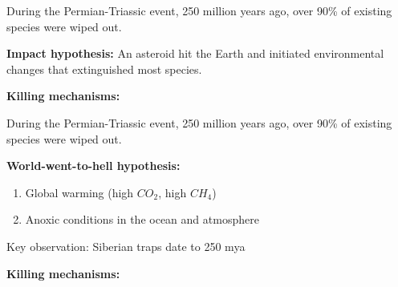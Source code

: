\begin{frame}[t]
    \begin{adjustwidth}{-2em}{-1.5em}
        During the Permian-Triassic event, 250 million years ago, over 90\% of
        existing species were wiped out.

        \vspace{4mm}
        \textbf{Impact hypothesis:} An asteroid hit the Earth and initiated
        environmental changes that extinguished most species.

        \vspace{4mm}
        \textbf{Killing mechanisms:}
            
    \end{adjustwidth}
\end{frame}

\begin{frame}[t]
    \begin{adjustwidth}{-2em}{-1.5em}
        During the Permian-Triassic event, 250 million years ago, over 90\% of
        existing species were wiped out.

        \vspace{4mm}
        \textbf{World-went-to-hell hypothesis:}

        \begin{enumerate}
            \item Global warming (high $CO_2$, high $CH_4$)

            \item Anoxic conditions in the ocean and atmosphere
        \end{enumerate}

        \vspace{4mm}
        Key observation: Siberian traps date to 250 mya


        \textbf{Killing mechanisms:}

    \end{adjustwidth}
\end{frame}

